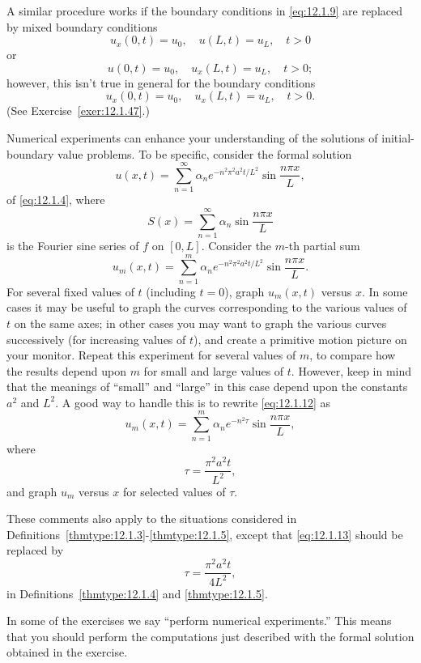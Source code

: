 A similar procedure works if the boundary conditions in \eqref{eq:12.1.9} are replaced by mixed
boundary conditions
\[
  u_{x}(0,t)=u_{0},\quad u(L,t)=u_{L},\quad t>0
\]
or
\[
  u(0,t)=u_{0},\quad u_{x}(L,t)=u_{L},\quad t>0;
\]
however, this isn't true in general for the boundary conditions
\[
  u_{x}(0,t)=u_{0},\quad u_{x}(L,t)=u_{L},\quad t>0.
\]
(See Exercise~\ref{exer:12.1.47}.)

\technology
\medskip
Numerical experiments can enhance your understanding of the solutions of initial-boundary value
problems. To be specific, consider the formal solution
\[
  u(x,t)=\sum_{n=1}^{\infty}\alpha_{n}e^{-n^{2}\pi^{2}a^{2}t/L^{2}}\sin\frac{n\pi x}{L},
\]
of \eqref{eq:12.1.4}, where
\[
  S(x)=\sum_{n=1}^{\infty}\alpha_{n}\sin\frac{n\pi x}{L}
\]
is the Fourier sine series of $f$ on $[0,L]$. Consider the $m$-th partial sum
\begin{equation}
  \label{eq:12.1.12}u_{m}(x,t)=\sum_{n=1}^{m}\alpha_{n}e^{-n^{2}\pi^{2}a^{2}t/L^{2}}\sin\frac{n\pi x}{L}.
\end{equation}
For several fixed values of $t$ (including $t=0$), graph $u_{m}(x,t)$ versus $x$. In some cases it
may be useful to graph the curves corresponding to the various values of $t$ on the same axes; in
other cases you may want to graph the various curves successively (for increasing values of $t$),
and create a primitive motion picture on your monitor. Repeat this experiment for several values of
$m$, to compare how the results depend upon $m$ for small and large values of $t$. However, keep in
mind that the meanings of ``small'' and ``large'' in this case depend upon the constants $a^{2}$ and
$L^{2}$. A good way to handle this is to rewrite \eqref{eq:12.1.12} as
\[
  u_{m}(x,t)=\sum_{n=1}^{m}\alpha_{n}e^{-n^{2}\tau}\sin\frac{n\pi x}{L},
\]
where
\begin{equation}
  \label{eq:12.1.13}\tau=\frac{\pi^{2}a^{2}t}{L^{2}},
\end{equation}
and graph $u_{m}$ versus $x$ for selected values of $\tau$.

These comments also apply to the situations considered in
Definitions~\ref{thmtype:12.1.3}-\ref{thmtype:12.1.5}, except that \eqref{eq:12.1.13} should be
replaced by
\[
  \tau=\frac{\pi^{2}a^{2}t}{4L^{2}},
\]
in Definitions~\ref{thmtype:12.1.4} and \ref{thmtype:12.1.5}.

In some of the exercises we say ``perform numerical experiments.'' This means that you should
perform the computations just described with the formal solution obtained in the exercise.

